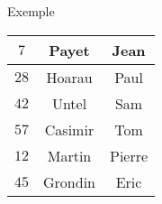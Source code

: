 \documentclass[10pt]{beamer}
\begin{document}
\begin{frame}{\Ctitle}{\stitle}
\begin{exampleblock}{Exemple}
{\begin{center}
\begin{tabular}{|>{\small}c|>{\small}c|>{\small}c|}
					$7$                     & Payet   & Jean                    \\
					\hline
					$28$                    & Hoarau  & Paul                    \\
					\hline
					$42$                    & Untel   & Sam                     \\
					\hline
					$57$                    & Casimir & Tom                     \\
					\hline
					$12$                    & Martin  & Pierre                  \\
					\hline
					$45$                    & Grondin & Eric                    \\
					\hline
				\end{tabular}
			\end{center}}
	\end{exampleblock}
\end{frame}
\end{document}
